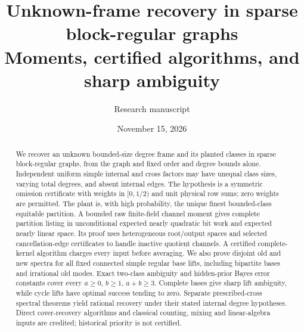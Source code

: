 \documentclass[11pt]{article}
\title{Unknown-frame recovery in sparse block-regular graphs\\Moments, certified algorithms, and sharp ambiguity}
\author{Research manuscript}
\date{November 15, 2026}
\theoremstyle{remark}
\begin{document}
\maketitle
\begin{abstract}
We recover an unknown bounded-size degree frame and its planted classes
in sparse block-regular graphs, from the graph and fixed order and degree
bounds alone. Independent uniform simple internal and cross factors may
have unequal class sizes, varying total degrees, and absent internal
edges. The hypothesis is a symmetric omission certificate with weights
in $[0,1/2)$ and unit physical row sums; zero weights are permitted.
The plant is, with high probability, the unique finest bounded-class
equitable partition. A bounded raw finite-field channel moment gives
complete partition listing in unconditional expected nearly quadratic
bit work and expected nearly linear space. Its proof uses heterogeneous
root/output spaces and selected cancellation-edge certificates to handle
inactive quotient channels. A certified complete-kernel algorithm
charges every input before averaging. We also prove disjoint old and
new spectra for all fixed connected simple regular base lifts, including
bipartite bases and irrational old modes. Exact two-class ambiguity and
hidden-prior Bayes error constants cover every $a\ge0$, $b\ge1$,
$a+b\ge3$. Complete bases give sharp lift ambiguity, while cycle lifts
have optimal success tending to zero. Separate prescribed-cross
spectral theorems yield rational recovery under their stated internal
degree hypotheses. Direct cover-recovery algorithms and classical
counting, mixing and linear-algebra inputs are credited; historical
priority is not certified.
\end{abstract}
\tableofcontents














\appendix


\end{document}
